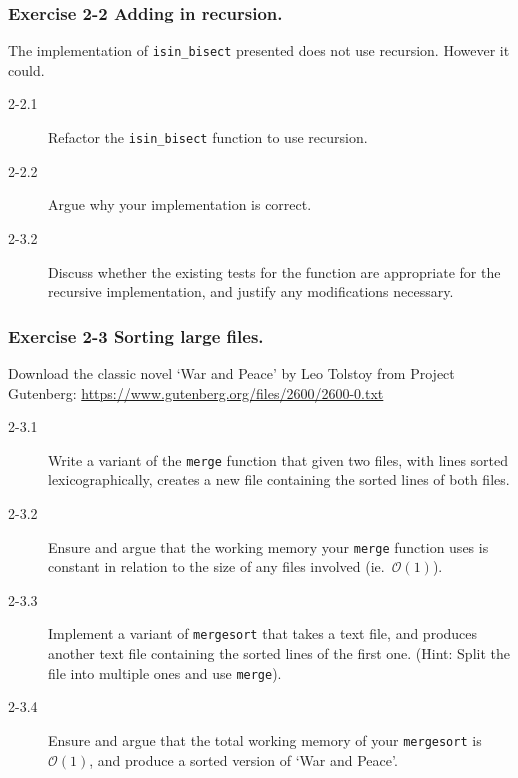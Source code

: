 \documentclass{beamer} %
\begin{document}
\begin{frame}
\frametitle{Exercise 2-2 Adding in recursion.}

The implementation of \texttt{isin\_bisect} presented does not use recursion. However it could.
\begin{description}
	\item[2-2.1] Refactor the \texttt{isin\_bisect} function to use recursion.
	\item[2-2.2] Argue why your implementation is correct.
	\item[2-3.2] Discuss whether the existing tests for the function are appropriate for the recursive implementation, and justify any modifications necessary.
\end{description}

\end{frame}

\begin{frame}
\frametitle{Exercise 2-3 Sorting large files.}

Download the classic novel `War and Peace' by Leo Tolstoy from Project Gutenberg: \url{https://www.gutenberg.org/files/2600/2600-0.txt}
\begin{description}
	\item[2-3.1] Write a variant of the \texttt{merge} function that given two files, with lines sorted lexicographically, creates a new file containing the sorted lines of both files.
	\item[2-3.2] Ensure and argue that the working memory your \texttt{merge} function uses is constant in relation to the size of any files involved (ie.\ $\mathcal{O}(1)$).
	\item[2-3.3] Implement a variant of \texttt{mergesort} that takes a text file, and produces another text file containing the sorted lines of the first one. (Hint: Split the file into multiple ones and use \texttt{merge}).
	\item[2-3.4] Ensure and argue that the total working memory of your \texttt{mergesort} is $\mathcal{O}(1)$, and produce a sorted version of `War and Peace'.
\end{description}

\end{frame}
\end{document}
